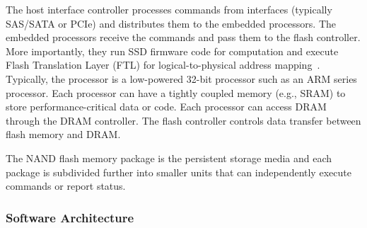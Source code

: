 The host interface controller processes commands from interfaces (typically SAS/SATA or PCIe) and distributes them to the embedded processors.
The embedded processors receive the commands and pass them to the flash controller. More importantly, they run SSD firmware code for computation and execute Flash Translation Layer (FTL) for logical-to-physical address mapping~\cite{Chung2009SFT}. Typically, the processor is a low-powered 32-bit processor such as an ARM series processor. Each processor can have a tightly coupled memory (e.g., SRAM) to store performance-critical data or code. Each processor can access DRAM through the DRAM controller. The flash controller controls data transfer between flash memory and DRAM.


The NAND flash memory package is the persistent storage media and each package is subdivided further into smaller units that can independently execute commands or report status.

\subsubsection{Software Architecture}\label{sec:softArch}



